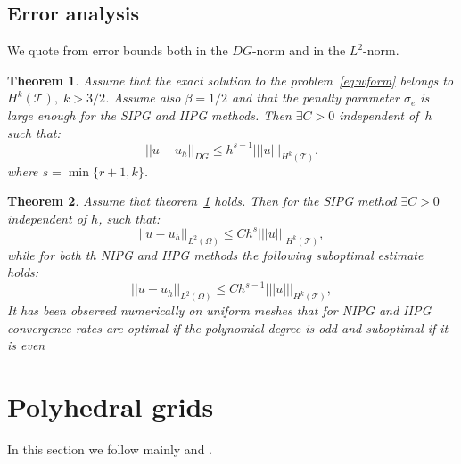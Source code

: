 \documentclass[12pt, a4paper]{article}
\theoremstyle{definition}
\theoremstyle{plain}
\theoremstyle{plain}
\newtheorem{teor}{Theorem}
\begin{document}
\subsection{Error analysis}
We quote from \cite{riviere} error bounds both in the $DG$-norm and in the $L^2$-norm.
\begin{teor} \label{teo:errdg}
	Assume that the exact solution to the problem~\eqref{eq:wform} belongs to $H^k(\mathcal{T}), \; k>3/2$. Assume also $\beta = 1/2$ and that the penalty parameter $\sigma_e$ is large enough for the SIPG and IIPG methods. Then $\exists C>0$ independent of~$h$ such that:
	\begin{equation*}
		|\!| u -u_h |\!|_{DG} \leq h^{s-1} |\!|\!|u|\!|\!|_{H^k(\mathcal{T})}.
	\end{equation*}
	where $s = \min \{r+1, k\}$.
\end{teor}
\begin{teor}
	Assume that theorem~\ref{teo:errdg} holds. Then for the SIPG method $\exists C>0$ independent of $h$, such that:
	\begin{equation*}
		|\!| u-u_h |\!|_{L^2(\Omega)} \leq C h^{s} |\!|\!|u|\!|\!|_{H^k(\mathcal{T})},
	\end{equation*}
	while for both th NIPG and IIPG methods the following suboptimal estimate holds:
	\begin{equation*}
				|\!| u-u_h |\!|_{L^2(\Omega)} \leq C h^{s-1} |\!|\!|u|\!|\!|_{H^k(\mathcal{T})},
	\end{equation*}
	It has been observed numerically on uniform meshes that for NIPG and IIPG convergence rates are optimal if the polynomial degree is odd and suboptimal if it is even
\end{teor}
\section{Polyhedral grids}\label{sec:poly}
In this section we follow mainly \cite{multigrid} and \cite{hpmet}.
\end{document}
